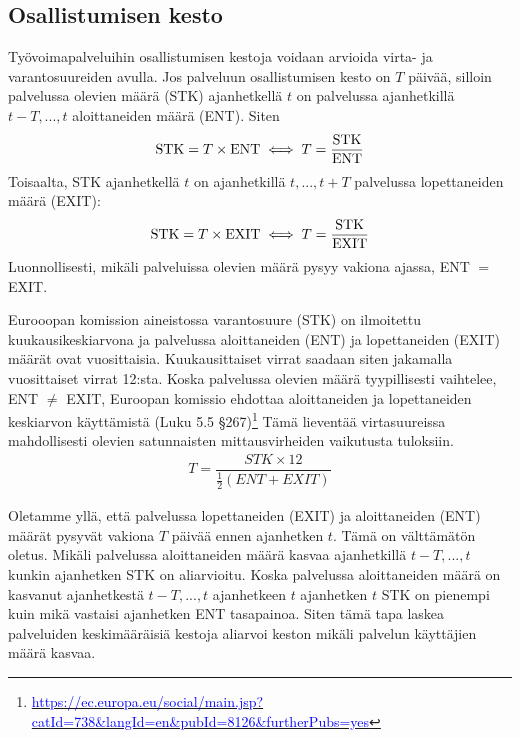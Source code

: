 \documentclass[12pt]{article}
\begin{document}
\subsection{Osallistumisen kesto}

Työvoimapalveluihin osallistumisen kestoja voidaan arvioida virta- ja varantosuureiden avulla. Jos palveluun osallistumisen kesto on $T$ päivää, silloin palvelussa olevien määrä (STK) ajanhetkellä $t$ on palvelussa ajanhetkillä $t - T, ..., t$ aloittaneiden määrä (ENT). Siten 
\begin{align}
 \textup{STK} = T \times \textup{ENT} \iff T = \dfrac{\textup{STK}}{\textup{ENT}}
\end{align}
Toisaalta, STK ajanhetkellä $t$ on ajanhetkillä $t, ..., t + T$ palvelussa lopettaneiden määrä (EXIT):   
\begin{align}
 \textup{STK} = T \times \textup{EXIT} \iff T = \dfrac{\textup{STK}}{\textup{EXIT}}
\end{align}
Luonnollisesti, mikäli palveluissa olevien määrä pysyy vakiona ajassa, ENT $=$ EXIT. 

Eurooopan komission aineistossa varantosuure (STK) on ilmoitettu kuukausikeskiarvona ja palvelussa aloittaneiden (ENT) ja lopettaneiden (EXIT) määrät ovat vuosittaisia. Kuukausittaiset virrat saadaan siten jakamalla vuosittaiset virrat 12:sta. Koska palvelussa olevien määrä tyypillisesti vaihtelee, ENT $\neq$ EXIT, Euroopan komissio ehdottaa aloittaneiden ja lopettaneiden keskiarvon käyttämistä (Luku 5.5 \S 267)\footnote{\href{https://ec.europa.eu/social/main.jsp?catId=738&langId=en&pubId=8126&furtherPubs=yes}{\textcolor{blue}{https://ec.europa.eu/social/main.jsp?catId=738\&langId=en\&pubId=8126\&furtherPubs=yes}}} Tämä lieventää virtasuureissa mahdollisesti olevien satunnaisten mittausvirheiden vaikutusta tuloksiin.
\begin{align}
 T = \dfrac{STK \times 12}{\frac{1}{2} (ENT + EXIT)}
\end{align} 

Oletamme yllä, että palvelussa lopettaneiden (EXIT) ja aloittaneiden (ENT) määrät pysyvät vakiona $T$ päivää ennen ajanhetken $t$. Tämä on välttämätön oletus. Mikäli palvelussa aloittaneiden määrä kasvaa ajanhetkillä $t- T, ..., t$ kunkin ajanhetken STK on aliarvioitu. Koska palvelussa aloittaneiden määrä on kasvanut ajanhetkestä $t - T, ..., t$ ajanhetkeen $t$ ajanhetken $t$ STK on pienempi kuin mikä vastaisi ajanhetken ENT tasapainoa. Siten tämä tapa laskea palveluiden keskimääräisiä kestoja aliarvoi keston mikäli palvelun käyttäjien määrä kasvaa. 
\end{document}
